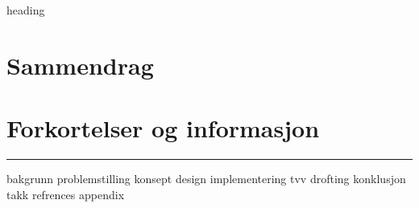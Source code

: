 \documentclass[a4paper,11pt,norsk]{article}
\begin{document}
{heading}
\section*{Sammendrag}
\section*{Forkortelser og informasjon}
\rule{\textwidth}{1pt}
{bakgrunn}
{problemstilling}
{konsept}
{design}
{implementering}
{tvv}
{drofting}
{konklusjon}
{takk}
{refrences}
{appendix}
\end{document}
